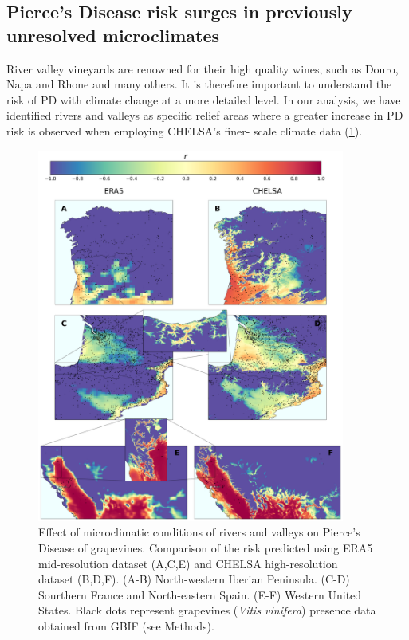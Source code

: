 \subsection{Pierce's Disease risk surges in previously unresolved
    microclimates}

River valley vineyards are renowned  for their high quality wines, such as
Douro, Napa and Rhone and many others. It is therefore important to understand
the risk of  PD with climate change at	a more detailed level. In our analysis,
we have identified rivers and valleys as specific relief areas where a greater
increase in PD risk is observed when employing CHELSA’s finer- scale climate
data (\cref{fig:microclimates}).

\begin{figure}[H]
    \centering
    \includegraphics[width=0.9\textwidth]{Figures/ERA5_vs_CHELSA_rivers.pdf}
    \caption{Effect of microclimatic conditions of rivers and valleys on
        Pierce's Disease of grapevines. Comparison of the risk predicted using
        ERA5
        mid-resolution dataset (A,C,E) and CHELSA high-resolution dataset
        (B,D,F).
        (A-B) North-western Iberian Peninsula. (C-D) Sourthern France and
        North-eastern
        Spain. (E-F) Western United States. Black dots represent grapevines
        (\textit{Vitis vinifera}) presence data obtained from GBIF (see
        Methods).}
    \label{fig:microclimates}
\end{figure}

